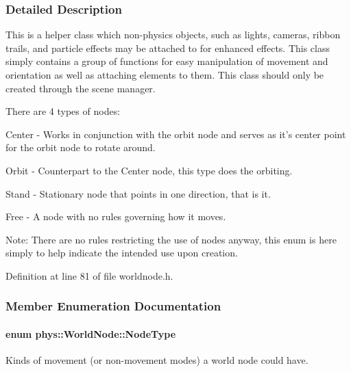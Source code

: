 \subsubsection{Detailed Description}
This is a helper class which non-\/physics objects, such as lights, cameras, ribbon trails, and particle effects may be attached to for enhanced effects. This class simply contains a group of functions for easy manipulation of movement and orientation as well as attaching elements to them. This class should only be created through the scene manager. \par
 There are 4 types of nodes: \par
 Center -\/ Works in conjunction with the orbit node and serves as it's center point for the orbit node to rotate around. \par
 Orbit -\/ Counterpart to the Center node, this type does the orbiting. \par
 Stand -\/ Stationary node that points in one direction, that is it. \par
 Free -\/ A node with no rules governing how it moves. \par
 Note: There are no rules restricting the use of nodes anyway, this enum is here simply to help indicate the intended use upon creation. 

Definition at line 81 of file worldnode.h.



\subsubsection{Member Enumeration Documentation}
\hypertarget{classphys_1_1WorldNode_a0b178b06aa411b00c4c2ccd926d9bf5a}{
\paragraph[{NodeType}]{\setlength{\rightskip}{0pt plus 5cm}enum {\bf phys::WorldNode::NodeType}}\hfill}
\label{d2/d3e/classphys_1_1WorldNode_a0b178b06aa411b00c4c2ccd926d9bf5a}


Kinds of movement (or non-\/movement modes) a world node could have. 

